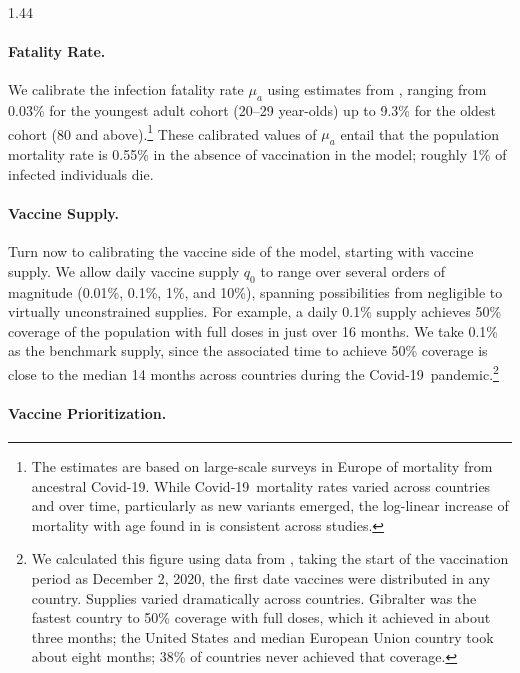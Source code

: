 \documentclass[12pt]{article}
\newcommand{\covid}{Covid-19}
\begin{document}
\begin{spacing}{1.44}
\paragraph{Fatality Rate.}

We calibrate the infection fatality rate $\mu_a$ using estimates from
\citet{Verity2020}, ranging from 0.03\% for the youngest adult cohort
(20--29 year-olds) up to 9.3\% for the oldest cohort (80 and
above).\footnote{The \citet{Verity2020} estimates are based on
large-scale surveys in Europe of mortality from ancestral
\covid. While \covid\ mortality rates varied across countries and over
time, particularly as new variants emerged, the log-linear increase of
mortality with age found in \citet{Verity2020} is consistent across
studies.} These calibrated values of $\mu_a$ entail that the
population mortality rate is 0.55\% in the absence of vaccination in
the model; roughly 1\% of infected individuals die.

\paragraph{Vaccine Supply.}

Turn now to calibrating the vaccine side of the model, starting with
vaccine supply. We allow daily vaccine supply $q_0$ to range over
several orders of magnitude (0.01\%, 0.1\%, 1\%, and 10\%), spanning
possibilities from negligible
to virtually unconstrained supplies. For example, a daily 0.1\% supply
achieves 50\% coverage of the population with full doses in just over
16 months. We take 0.1\% as the benchmark supply, since the associated
time to achieve 50\% coverage is close to the median 14 months across
countries during the \covid\ pandemic.\footnote{We calculated this
figure using data from \citet{OWID_COVID_Vax}, taking the start of the
vaccination period as December 2, 2020, the first date vaccines were
distributed in any country. Supplies varied dramatically across
countries. Gibralter was the fastest country to 50\% coverage with
full doses, which it achieved in about three months; the United States
and median European Union country took about eight months; 38\% of
countries never achieved that coverage.}

\paragraph{Vaccine Prioritization.}


\end{spacing}
\end{document}
